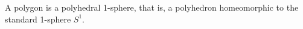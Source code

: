 A polygon is a polyhedral 1-sphere, that is, a polyhedron homeomorphic to the standard 1-sphere $S^1$.
